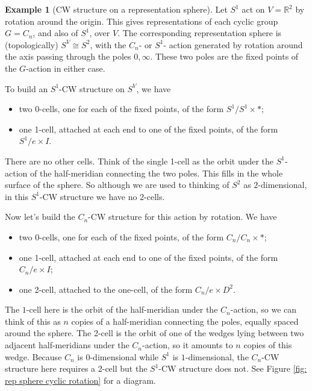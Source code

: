 \documentclass{amsart}
\theoremstyle{definition}
\newtheorem{example}[thm]{Example}
\numberwithin{thm}{section}
\def\R{\mathbb{R}}
\begin{document}
\begin{example}[CW structure on a representation sphere]
  Let $S^1$ act on $V = \R^2$ by rotation around the origin. This gives representations of each cyclic group $G = C_n$, and also of $S^1$, over $V$. The corresponding representation sphere is (topologically) $S^V \cong S^2$, with the $C_n$- or $S^1$- action generated by rotation around the axis passing through the poles $0, \infty$. These two poles are the fixed points of the $G$-action in either case.

  To build an $S^1$-CW structure on $S^V$, we have 
  \begin{itemize}
    \item two 0-cells, one for each of the fixed points, of the form $S^1/S^1 \times *$;
    \item one 1-cell, attached at each end to one of the fixed points, of the form $S^1/e \times I$.
  \end{itemize}
  There are no other cells. Think of the single 1-cell as the orbit under the $S^1$-action of the half-meridian connecting the two poles. This fills in the whole surface of the sphere. So although we are used to thinking of $S^2$ as $2$-dimensional, in this $S^1$-CW structure we have no 2-cells.

  Now let's build the $C_n$-CW structure for this action by rotation. We have 
  \begin{itemize}
    \item two 0-cells, one for each of the fixed points, of the form $C_n/C_n \times *$;
    \item one 1-cell, attached at each end to one of the fixed points, of the form $C_n/e \times I$;
    \item one 2-cell, attached to the one-cell, of the form $C_n/e \times D^2$.
  \end{itemize}
  The $1$-cell here is the orbit of the half-meridian under the $C_n$-action, so we can think of this as $n$ copies of a half-meridian connecting the poles, equally spaced around the sphere. The 2-cell is the orbit of one of the wedges lying between two adjacent half-meridians under the $C_n$-action, so it amounts to $n$ copies of this wedge. Because $C_n$ is $0$-dimensional while $S^1$ is $1$-dimensional, the $C_n$-CW structure here requires a 2-cell but the $S^1$-CW structure does not. See Figure \ref{fig: rep sphere cyclic rotation} for a diagram.
\end{example}
\end{document}
